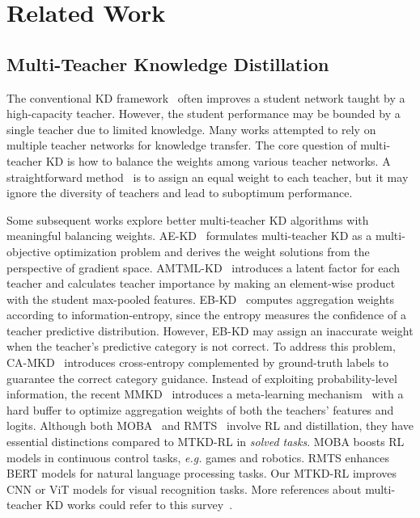 \section{Related Work}
\subsection{Multi-Teacher Knowledge Distillation}
	The conventional KD framework~\cite{hinton2015distilling,yang2021hierarchical,yang2022knowledge,yang2022cross,yang2024clip} often improves a student network taught by a high-capacity teacher. However, the student performance may be bounded by a single teacher due to limited knowledge. Many works attempted to rely on multiple teacher networks for knowledge transfer. The core question of multi-teacher KD is how to balance the weights among various teacher networks. A straightforward method~\cite{you2017learning} is to assign an equal weight to each teacher, but it may ignore the diversity of teachers and lead to suboptimum performance. 
	
	Some subsequent works explore better multi-teacher KD algorithms with meaningful balancing weights.  AE-KD~\cite{du2020agree} formulates multi-teacher KD as a multi-objective optimization problem and derives the weight solutions from the perspective of gradient space. AMTML-KD~\cite{liu2020adaptive} introduces a latent factor for each teacher and calculates teacher importance by making an element-wise product with the student max-pooled features. EB-KD~\cite{kwon2020adaptive}  computes aggregation weights according to information-entropy, since the entropy measures the confidence of a teacher predictive distribution. However,  EB-KD may assign an inaccurate weight when the teacher's predictive category is not correct. To address this problem, CA-MKD~\cite{zhang2022confidence} introduces cross-entropy complemented by ground-truth labels to guarantee the correct category guidance. Instead of exploiting probability-level information, the recent MMKD~\cite{zhang2023adaptive} introduces a meta-learning mechanism~\cite{finn2017model} with a hard buffer to optimize aggregation weights of both the teachers' features and logits. Although both MOBA~\cite{kang2022moba} and RMTS~\cite{yuan2021reinforced} involve RL and distillation, they have essential distinctions compared to MTKD-RL in \emph{solved tasks}. MOBA boosts RL models in continuous control tasks, \emph{e.g.} games and robotics. RMTS enhances BERT models for natural language processing tasks. Our MTKD-RL improves CNN or ViT models for visual recognition tasks. More references about multi-teacher KD works could refer to this survey~\cite{yang2023categories}. 
	
